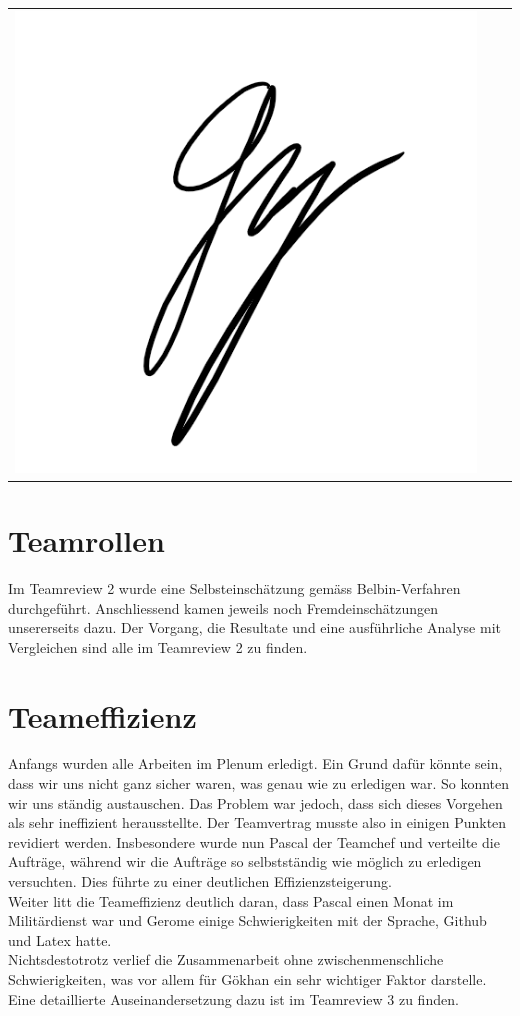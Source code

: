 \begin{tabular}{p{4cm}p{5cm}p{5.5cm}}
\includegraphics[scale=0.6]{img/unterschriftGoekhan}
\end{tabular}

\section{Teamrollen}

Im Teamreview 2 wurde eine Selbsteinschätzung gemäss Belbin-Verfahren durchgeführt. Anschliessend kamen jeweils noch Fremdeinschätzungen unsererseits dazu. Der Vorgang, die Resultate und eine ausführliche Analyse mit Vergleichen sind alle im Teamreview 2 zu finden. 

\section{Teameffizienz}

Anfangs wurden alle Arbeiten im Plenum erledigt. Ein Grund dafür könnte sein, dass wir uns nicht ganz sicher waren, was genau wie zu erledigen war. So konnten wir uns ständig austauschen. Das Problem war jedoch, dass sich dieses Vorgehen als sehr ineffizient herausstellte. Der Teamvertrag musste also in einigen Punkten revidiert werden. Insbesondere wurde nun Pascal der Teamchef und verteilte die Aufträge, während wir die Aufträge so selbstständig wie möglich zu erledigen versuchten. Dies führte zu einer deutlichen Effizienzsteigerung. \\
Weiter litt die Teameffizienz deutlich daran, dass Pascal einen Monat im Militärdienst war und Gerome einige Schwierigkeiten mit der Sprache, Github und Latex hatte. \\
Nichtsdestotrotz verlief die Zusammenarbeit ohne zwischenmenschliche Schwierigkeiten, was vor allem für Gökhan ein sehr wichtiger Faktor darstelle.  \\
Eine detaillierte Auseinandersetzung dazu ist im Teamreview 3 zu finden.  
